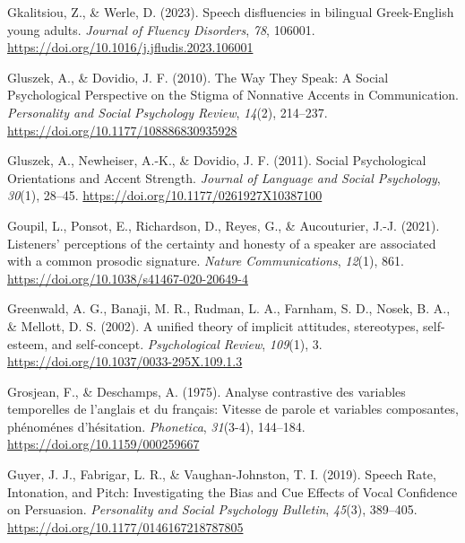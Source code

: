 \documentclass[
  man,floatsintext]{apa7}
\newlength{\cslhangindent}
\newlength{\cslentryspacingunit} %
\newenvironment{CSLReferences}[2] %
 {%
  \setlength{\parindent}{0pt}
  \ifodd #1
  \let\oldpar\par
  \def\par{\hangindent=\cslhangindent\oldpar}
  \fi
  \setlength{\parskip}{#2\cslentryspacingunit}
 }%
 {}
\begin{document}
\begin{CSLReferences}{1}{0}
\leavevmode{}%
Gkalitsiou, Z., \& Werle, D. (2023). Speech disfluencies in bilingual {G}reek-{E}nglish young adults. \emph{Journal of Fluency Disorders}, \emph{78}, 106001. \url{https://doi.org/10.1016/j.jfludis.2023.106001}

\leavevmode{}%
Gluszek, A., \& Dovidio, J. F. (2010). The {W}ay {T}hey {S}peak: {A} {S}ocial {P}sychological {P}erspective on the {S}tigma of {N}onnative {A}ccents in {C}ommunication. \emph{Personality and Social Psychology Review}, \emph{14}(2), 214--237. \url{https://doi.org/10.1177/108886830935928}

\leavevmode{}%
Gluszek, A., Newheiser, A.-K., \& Dovidio, J. F. (2011). Social {P}sychological {O}rientations and {A}ccent {S}trength. \emph{Journal of Language and Social Psychology}, \emph{30}(1), 28--45. \url{https://doi.org/10.1177/0261927X10387100}

\leavevmode{}%
Goupil, L., Ponsot, E., Richardson, D., Reyes, G., \& Aucouturier, J.-J. (2021). Listeners' perceptions of the certainty and honesty of a speaker are associated with a common prosodic signature. \emph{Nature Communications}, \emph{12}(1), 861. \url{https://doi.org/10.1038/s41467-020-20649-4}

\leavevmode{}%
Greenwald, A. G., Banaji, M. R., Rudman, L. A., Farnham, S. D., Nosek, B. A., \& Mellott, D. S. (2002). A unified theory of implicit attitudes, stereotypes, self-esteem, and self-concept. \emph{Psychological Review}, \emph{109}(1), 3. \url{https://doi.org/10.1037/0033-295X.109.1.3}

\leavevmode{}%
Grosjean, F., \& Deschamps, A. (1975). Analyse contrastive des variables temporelles de l'anglais et du fran{ç}ais: Vitesse de parole et variables composantes, ph{é}nom{é}nes d'h{é}sitation. \emph{Phonetica}, \emph{31}(3-4), 144--184. \url{https://doi.org/10.1159/000259667}

\leavevmode{}%
Guyer, J. J., Fabrigar, L. R., \& Vaughan-Johnston, T. I. (2019). Speech {R}ate, {I}ntonation, and {P}itch: {I}nvestigating the {B}ias and {C}ue {E}ffects of {V}ocal {C}onfidence on {P}ersuasion. \emph{Personality and Social Psychology Bulletin}, \emph{45}(3), 389--405. \url{https://doi.org/10.1177/0146167218787805}


\end{CSLReferences}
\end{document}
